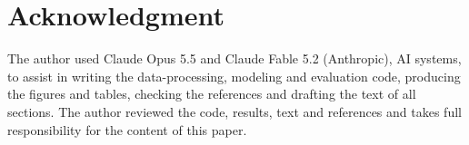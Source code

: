 \documentclass[conference]{IEEEtran}
\begin{document}
\section*{Acknowledgment}
The author used Claude Opus 5.5 and Claude Fable 5.2 (Anthropic), AI systems, to assist in writing the data-processing, modeling and evaluation code, producing the figures and tables, checking the references and drafting the text of all sections. The author reviewed the code, results, text and references and takes full responsibility for the content of this paper.



\end{document}
